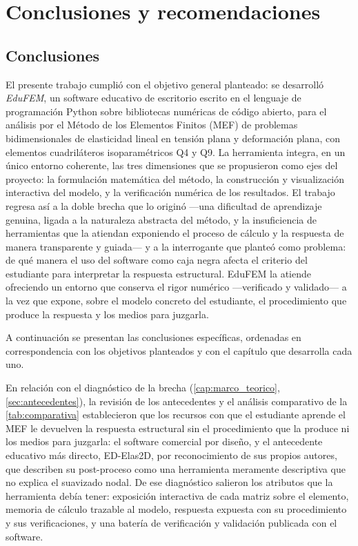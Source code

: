 \chapter*{Conclusiones y recomendaciones}

\section*{Conclusiones}

El presente trabajo cumplió con el objetivo general planteado: se desarrolló \emph{EduFEM}, un software educativo de escritorio escrito en el lenguaje de programación Python sobre bibliotecas numéricas de código abierto, para el análisis por el Método de los Elementos Finitos (MEF) de problemas bidimensionales de elasticidad lineal en tensión plana y deformación plana, con elementos cuadriláteros isoparamétricos Q4 y Q9. La herramienta integra, en un único entorno coherente, las tres dimensiones que se propusieron como ejes del proyecto: la formulación matemática del método, la construcción y visualización interactiva del modelo, y la verificación numérica de los resultados. El trabajo regresa así a la doble brecha que lo originó —una dificultad de aprendizaje genuina, ligada a la naturaleza abstracta del método, y la insuficiencia de herramientas que la atiendan exponiendo el proceso de cálculo y la respuesta de manera transparente y guiada— y a la interrogante que planteó como problema: de qué manera el uso del software como caja negra afecta el criterio del estudiante para interpretar la respuesta estructural. EduFEM la atiende ofreciendo un entorno que conserva el rigor numérico —verificado y validado— a la vez que expone, sobre el modelo concreto del estudiante, el procedimiento que produce la respuesta y los medios para juzgarla.

A continuación se presentan las conclusiones específicas, ordenadas en correspondencia con los objetivos planteados y con el capítulo que desarrolla cada uno.

En relación con el diagnóstico de la brecha (\autoref{cap:marco_teorico}, \autoref{sec:antecedentes}), la revisión de los antecedentes y el análisis comparativo de la \autoref{tab:comparativa} establecieron que los recursos con que el estudiante aprende el MEF le devuelven la respuesta estructural sin el procedimiento que la produce ni los medios para juzgarla: el software comercial por diseño, y el antecedente educativo más directo, ED-Elas2D, por reconocimiento de sus propios autores, que describen su post-proceso como una herramienta meramente descriptiva que no explica el suavizado nodal. De ese diagnóstico salieron los atributos que la herramienta debía tener: exposición interactiva de cada matriz sobre el elemento, memoria de cálculo trazable al modelo, respuesta expuesta con su procedimiento y sus verificaciones, y una batería de verificación y validación publicada con el software.

